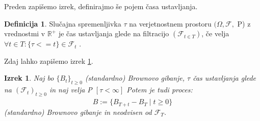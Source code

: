 \documentclass[11pt]{article}
\theoremstyle{definition}
\newtheorem{definicija}{Definicija}
\theoremstyle{plain}
\newtheorem{izrek}{Izrek}
\newcommand{\f}{\mathcal{F}}
\begin{document}
    Preden zapišemo izrek, definirajmo še pojem časa ustavljanja.
    
    \begin{definicija}
        Slučajna spremenljivka $\tau$ na verjetnostnem prostoru $ (\Omega, \f, $ P) z vrednostmi v $ \mathbb{R}^+ $
        je čas ustavljanja glede na filtracijo $ (\f_{t \in T}) $, če velja $ \forall t \in T: \{ \tau <= t \} \in \f_t $ .
    \end{definicija}
    
    Zdaj lahko zapišemo izrek \ref{thm:stopped_brownian}. %
    
    \begin{izrek}
        \label{thm:stopped_brownian}
        Naj bo $\{B_t\}_{t \geq 0}$ (standardno) Brownovo gibanje, $ \tau $ čas ustavljanja glede na 
        $ (\f_t)_{t \geq 0} $ in naj velja P $[\tau < \infty]$
        Potem je tudi proces:
        \[
        \hat{B} := \{B_{T+t} - B_T \mid t \geq 0\}
        \]
        (standardno) Brownovo gibanje in neodvisen od $ \f_T $.
    \end{izrek}
    


\end{document}
